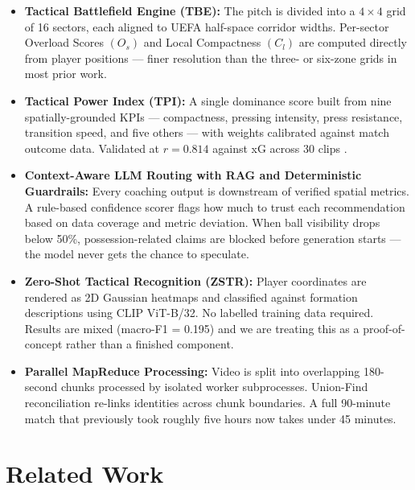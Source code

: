 \documentclass[conference]{IEEEtran}
\begin{document}
\begin{itemize}

    \item \textbf{Tactical Battlefield Engine (TBE):} The pitch is divided into a $4\times4$ grid of 16 sectors, each aligned to UEFA half-space corridor widths. Per-sector Overload Scores $(O_{s})$ and Local Compactness $(C_{l})$ are computed directly from player positions --- finer resolution than the three- or six-zone grids in most prior work.

    \item \textbf{Tactical Power Index (TPI):} A single dominance score built from nine spatially-grounded KPIs --- compactness, pressing intensity, press resistance, transition speed, and five others --- with weights calibrated against match outcome data. Validated at $r = 0.814$ against xG across 30 clips \cite{memmert2018}.

    \item \textbf{Context-Aware LLM Routing with RAG and Deterministic Guardrails:} Every coaching output is downstream of verified spatial metrics. A rule-based confidence scorer flags how much to trust each recommendation based on data coverage and metric deviation. When ball visibility drops below 50\%, possession-related claims are blocked before generation starts --- the model never gets the chance to speculate.

    \item \textbf{Zero-Shot Tactical Recognition (ZSTR):} Player coordinates are rendered as 2D Gaussian heatmaps and classified against formation descriptions using CLIP ViT-B/32. No labelled training data required. Results are mixed (macro-F1 = 0.195) and we are treating this as a proof-of-concept rather than a finished component.

    \item \textbf{Parallel MapReduce Processing:} Video is split into overlapping 180-second chunks processed by isolated worker subprocesses. Union-Find reconciliation re-links identities across chunk boundaries. A full 90-minute match that previously took roughly five hours now takes under 45 minutes.

\end{itemize}

\section{Related Work}
\label{sec:related}
\end{document}
